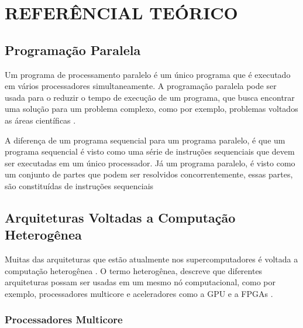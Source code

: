 
\chapter{REFERÊNCIAL TEÓRICO}
\label{chap:ref-teorico}

\section{Programação Paralela}

Um programa de processamento paralelo é um único programa que é executado em vários processadores simultaneamente.
A programação paralela pode ser usada para o reduzir o tempo de execução de um programa,
que busca encontrar uma solução para um problema complexo, como por exemplo, problemas voltados as áreas científicas \cite{hennessy2014organizaccao}.

A diferença de um programa sequencial para um programa paralelo, é que um programa sequencial é visto como uma série de instruções
sequenciais que devem ser executadas em um único processador.
Já um programa paralelo, é visto como um conjunto de partes que podem ser resolvidos concorrentemente,
essas partes, são constituídas de instruções sequenciais \cite{hennessy2014organizaccao,tanenbaum20103a}

\section{Arquiteturas Voltadas a Computação Heterogênea}
Muitas das arquiteturas que estão atualmente nos supercomputadores é voltada a computação heterogênea \cite{meuer2014top500}.
O termo heterogênea, descreve que diferentes arquiteturas possam ser usadas em um mesmo nó computacional, como por exemplo, processadores multicore e aceleradores como a GPU e a FPGAs \cite{intrArqHete:2012}.

\subsection{Processadores Multicore}
